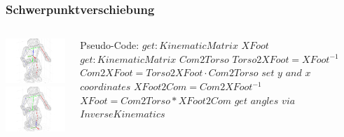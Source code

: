 \documentclass[]{beamer}
\begin{document}
\begin{frame}
	\frametitle{Schwerpunktverschiebung}
	\begin{columns}

		\includegraphics[width=4.7cm]{comtorso}
		\newline\newline
		\includegraphics[width=4.7cm]{comfoot}
		
		\column{0.7\textwidth}
		Pseudo-Code:
		\newline\newline
		$get: KinematicMatrix$ $XFoot$
		$get: KinematicMatrix$ $Com2Torso$
		\newline\newline
		$Torso2XFoot = XFoot^{-1}$	
		$Com2XFoot = Torso2XFoot \cdot Com2Torso$					
		\newline\newline
		$set$ $y$ $and$ $x$ $coordinates$
		\newline\newline
		$XFoot2Com = Com2XFoot^{-1}$
		$XFoot = Com2Torso * XFoot2Com$
		\newline\newline
		$get$ $angles$ $via$ $InverseKinematics$
	\end{columns}
\end{frame}
\end{document}

